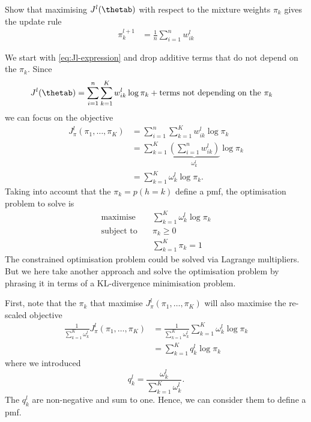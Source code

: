 \begin{exenumerate}
\item Show that maximising $J^l(\thetab)$ with respect to the mixture weights
  $\pi_k$ gives the update rule
  \begin{align}
    \pi_k^{l+1} &=  \frac{1}{n}\sum_{i=1}^n w_{ik}^l
  \end{align}
  \begin{solution}
    We start with \eqref{eq:Jl-expression} and drop additive terms that do not
    depend on the $\pi_k$. Since
    \begin{align}
      J^l(\thetab) & =  \sum_{i=1}^n  \sum_{k=1}^K w_{ik}^l  \log \pi_k + \text{terms not depending on the $\pi_k$}
    \end{align}
    we can focus on the objective
    \begin{align}
      J^l_\pi(\pi_1, \ldots, \pi_K) & = \sum_{i=1}^n  \sum_{k=1}^K w_{ik}^l  \log \pi_k\\ 
      &= \sum_{k=1}^K \underbrace{\left( \sum_{i=1}^n w_{ik}^l \right)}_{\omega_k^l}  \log \pi_k \\
                                        & =  \sum_{k=1}^K \omega_k^l \log \pi_k.
    \end{align}
    Taking into account that the $\pi_k = p(h=k)$ define a pmf, the optimisation problem to solve is
    \begin{align}
      \text{maximise} \quad&  \sum_{k=1}^K \omega_k^l \log \pi_k\\
      \text{subject to}\quad &  \pi_k \ge 0 \\
                     &  \sum_{k=1}^K \pi_k = 1 
    \end{align}
    The constrained optimisation problem could be solved via Lagrange
    multipliers. But we here take another approach and solve the optimisation
    problem by phrasing it in terms of a KL-divergence minimisation problem.

    First, note that the $\pi_k$ that maximise $J^l_\pi(\pi_1, \ldots,
    \pi_K)$ will also maximise the re-scaled objective
    \begin{align}
      \frac{1}{\sum_{k=1}^K \omega_k^l}  J_\pi^l(\pi_1, \ldots, \pi_K) & =  \frac{1}{\sum_{k=1}^K \omega_k^l}\sum_{k=1}^K \omega_k^l \log \pi_k\\
                                                                          &=   \sum_{k=1}^K q_k^l \log \pi_k
    \end{align}
    where we introduced
    \begin{equation}
      q_k^l = \frac{\omega_k^l}{\sum_{k=1}^K \omega_{k}^l}.
    \end{equation}
    The $q_k^l$ are non-negative and sum to one. Hence, we can consider them to
    define a pmf.


\end{solution}
\end{exenumerate}
